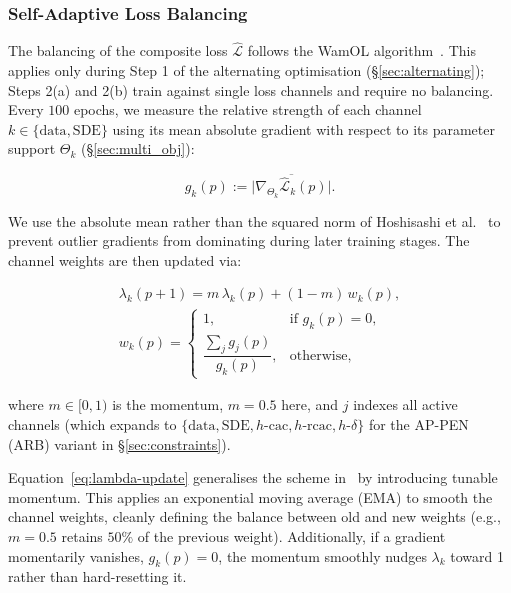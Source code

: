 \documentclass[sigconf, authorversion=true, nonacm=true]{acmart}
\begin{document}
\subsubsection{Self-Adaptive Loss Balancing}
\label{sec:loss_bal}

The balancing of the composite loss $\hat{\mathcal{L}}$ follows the WamOL algorithm~\cite{Hoshisashi2024Whack-a-moleSurface}. This applies only during Step 1 of the alternating optimisation (\S\ref{sec:alternating}); Steps 2(a) and 2(b) train against single loss channels and require no balancing. Every $100$ epochs, we measure the relative strength of each channel $k \in \{\text{data}, \text{SDE}\}$ using its mean absolute gradient with respect to its parameter support $\Theta_k$ (\S\ref{sec:multi_obj}):

\begin{equation}
g_k(p) := \overline{\big\lvert \nabla_{\Theta_k} \hat{\mathcal{L}}_k(p) \big\rvert}.
\label{eq:gradnorm}
\end{equation}

We use the absolute mean rather than the squared norm of Hoshisashi et al.~\cite{Hoshisashi2024Physics-InformedPDEs} to prevent outlier gradients from dominating during later training stages. The channel weights are then updated via:

\begin{equation}
\begin{gathered}
\lambda_k(p+1) = m\,\lambda_k(p) + (1-m)\, w_k(p), \\
w_k(p) =
\begin{cases}
1, & \text{if } g_k(p) = 0, \\[4pt]
\dfrac{\sum_{j} g_j(p)}{g_k(p)}, & \text{otherwise},
\end{cases}
\end{gathered}
\label{eq:lambda-update}
\end{equation}

where $m \in [0,1)$ is the momentum, $m=0.5$ here, and $j$ indexes all active channels (which expands to $\{\text{data}, \text{SDE}, h\text{-cac}, h\text{-rcac}, h\text{-}\delta\}$ for the AP-PEN (ARB) variant in \S\ref{sec:constraints}). 

Equation~\ref{eq:lambda-update} generalises the scheme in~\cite{Hoshisashi2024Physics-InformedPDEs} by introducing tunable momentum. This applies an exponential moving average (EMA) to smooth the channel weights, cleanly defining the balance between old and new weights (e.g., $m=0.5$ retains $50\%$ of the previous weight). Additionally, if a gradient momentarily vanishes, $g_k(p)=0$, the momentum smoothly nudges $\lambda_k$ toward 1 rather than hard-resetting it.
\end{document}
